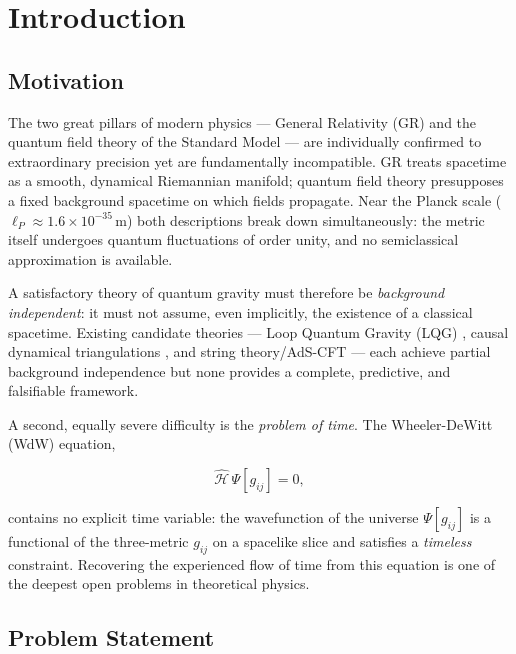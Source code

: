 \documentclass[12pt,a4paper]{article}
\newcommand{\lP}{\ell_P}
\begin{document}
\section{Introduction}
\label{sec:intro}

\subsection{Motivation}

The two great pillars of modern physics — General Relativity (GR) and
the quantum field theory of the Standard Model — are individually
confirmed to extraordinary precision yet are fundamentally incompatible.
GR treats spacetime as a smooth, dynamical Riemannian manifold;
quantum field theory presupposes a fixed background spacetime on which
fields propagate.
Near the Planck scale ($\lP \approx 1.6\times 10^{-35}\,\mathrm{m}$)
both descriptions break down simultaneously: the metric itself undergoes
quantum fluctuations of order unity, and no semiclassical approximation
is available.

A satisfactory theory of quantum gravity must therefore be
\emph{background independent}: it must not assume, even implicitly, the
existence of a classical spacetime.
Existing candidate theories — Loop Quantum Gravity (LQG)
\cite{ashtekar2004,thiemann1996}, causal dynamical triangulations
\cite{henson2006}, and string theory/AdS-CFT \cite{maldacena1997,witten1998}
— each achieve partial background independence but none provides a
complete, predictive, and falsifiable framework.

A second, equally severe difficulty is the \emph{problem of time}.
The Wheeler-DeWitt (WdW) equation,

\begin{equation}
\label{eq:wdw_intro}
\hat{\mathcal{H}}\,\Psi[g_{ij}] = 0,
\end{equation}

contains no explicit time variable: the wavefunction of the universe
$\Psi[g_{ij}]$ is a functional of the three-metric $g_{ij}$ on a
spacelike slice and satisfies a \emph{timeless} constraint.
Recovering the experienced flow of time from this equation is one of the
deepest open problems in theoretical physics.

\subsection{Problem Statement}
\end{document}
